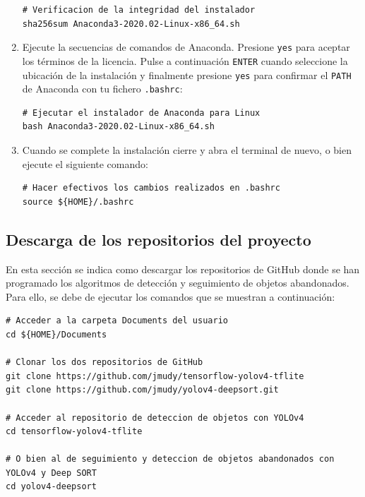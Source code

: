 \begin{enumerate}
\begin{lstlisting}[language=iPython,caption=Verificación de la integridad de la instalación de Anaconda,captionpos=b,label={lst:verificar-sha256}]
# Verificacion de la integridad del instalador
sha256sum Anaconda3-2020.02-Linux-x86_64.sh
\end{lstlisting}
    
    \item Ejecute la secuencias de comandos de Anaconda. Presione \texttt{yes} para aceptar los términos de la licencia. Pulse a continuación \texttt{ENTER} cuando seleccione la ubicación de la instalación y finalmente presione \texttt{yes} para confirmar el \texttt{PATH} de Anaconda con tu fichero \texttt{.bashrc}:
    
    \vspace{0.5cm}
    
\begin{lstlisting}[language=iPython,caption=Ejecutar el instalador de Anaconda para Linux,captionpos=b,label={lst:install-conda}]
# Ejecutar el instalador de Anaconda para Linux
bash Anaconda3-2020.02-Linux-x86_64.sh
\end{lstlisting}
    
    \item Cuando se complete la instalación cierre y abra el terminal de nuevo, o bien ejecute el siguiente comando:
    
    \vspace{0.5cm}
    
\begin{lstlisting}[language=iPython,caption=Hacer efectivo los cambios en el fichero .bashrc,captionpos=b,label={lst:source-bashrc}]
# Hacer efectivos los cambios realizados en .bashrc
source ${HOME}/.bashrc
\end{lstlisting}
\end{enumerate}

\subsection{Descarga de los repositorios del proyecto}
\label{subsec:descargas-repos}

En esta sección se indica como descargar los repositorios de GitHub donde se han programado los algoritmos de detección y seguimiento de objetos abandonados. Para ello, se debe de ejecutar los comandos que se muestran a continuación:

\vspace{0.5cm}

\begin{lstlisting}[language=iPython,caption=Descarga repositorio,captionpos=b,label={lst:descarga-repo}]
# Acceder a la carpeta Documents del usuario
cd ${HOME}/Documents

# Clonar los dos repositorios de GitHub
git clone https://github.com/jmudy/tensorflow-yolov4-tflite
git clone https://github.com/jmudy/yolov4-deepsort.git

# Acceder al repositorio de deteccion de objetos con YOLOv4
cd tensorflow-yolov4-tflite

# O bien al de seguimiento y deteccion de objetos abandonados con YOLOv4 y Deep SORT
cd yolov4-deepsort
\end{lstlisting}

